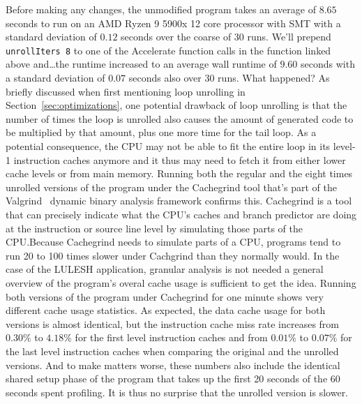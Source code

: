 \documentclass[fontsize=11pt,a4paper,parskip=half,numbers=noenddot]{scrartcl}
\newcommand{\hask}[1]{\texttt{#1}}
\begin{document}
Before making any changes, the unmodified program takes an average of $8.65$
seconds to run on an AMD Ryzen 9 5900x 12 core processor with SMT with a
standard deviation of $0.12$ seconds over the coarse of 30 runs. We'll prepend
\hask{unrollIters 8} to one of the Accelerate function calls in the function
linked above and\dots{}the runtime increased to an average wall runtime of
$9.60$ seconds with a standard deviation of $0.07$ seconds also over 30 runs.
What happened? As briefly discussed when first mentioning loop unrolling in
Section~\ref{sec:optimizations}, one potential drawback of loop unrolling is
that the number of times the loop is unrolled also causes the amount of
generated code to be multiplied by that amount, plus one more time for the tail
loop. As a potential consequence, the CPU may not be able to fit the entire loop
in its level-1 instruction caches anymore and it thus may need to fetch it from
either lower cache levels or from main memory. Running both the regular and the
eight times unrolled versions of the program under the Cachegrind tool that's
part of the Valgrind~\cite{nethercote2007valgrind} dynamic binary analysis
framework confirms this. Cachegrind is a tool that can precisely indicate what
the CPU's caches and branch predictor are doing at the instruction or source
line level by simulating those parts of the CPU.\@ Because Cachegrind needs to
simulate parts of a CPU, programs tend to run 20 to 100 times slower under
Cachgrind than they normally would. In the case of the LULESH application,
granular analysis is not needed a general overview of the program's overal cache
usage is sufficient to get the idea. Running both versions of the program under
Cachegrind for one minute shows very different cache usage statistics. As
expected, the data cache usage for both versions is almost identical, but the
instruction cache miss rate increases from $0.30\%$ to $4.18\%$ for the first
level instruction caches and from $0.01\%$ to $0.07\%$ for the last level
instruction caches when comparing the original and the unrolled versions. And to
make matters worse, these numbers also include the identical shared setup phase
of the program that takes up the first 20 seconds of the 60 seconds spent
profiling. It is thus no surprise that the unrolled version is slower.
\end{document}
